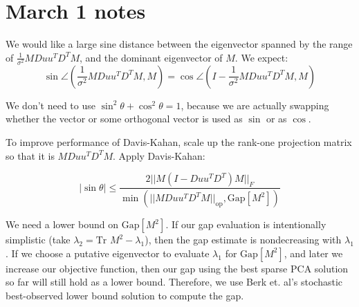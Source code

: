 \documentclass{article}
\begin{document}
\section{March 1 notes}

We would like a large sine distance between the eigenvector spanned by the range of $\frac{1}{\sigma^2} MDuu^T D^T M$, and the dominant eigenvector of $M$. We expect: $$\sin \angle(\frac{1}{\sigma^2} MDuu^T D^T M, M) = \cos \angle (I-\frac{1}{\sigma^2} MDuu^T D^T M, M)$$

We don't need to use $\sin^2\theta + \cos^2\theta = 1$, because we are actually swapping whether the vector or some orthogonal vector is used as $\sin$ or as $\cos$.

To improve performance of Davis-Kahan, scale up the rank-one projection matrix so that it is $MDuu^T D^T M$. Apply Davis-Kahan:

$$
|\sin\theta|
\le
\frac{2||M(I-Duu^TD^T)M||_F}{\min(||MDuu^TD^TM||_\text{op}, \text{Gap}[M^2])}
$$

We need a lower bound on $\text{Gap}[M^2]$. If our gap evaluation is intentionally simplistic (take $\lambda_2 = \text{Tr }M^2 - \lambda_1$), then the gap estimate is nondecreasing with $\lambda_1$. If we choose a putative eigenvector to evaluate $\lambda_1$ for $\text{Gap}[M^2]$, and later we increase our objective function, then our gap using the best sparse PCA solution so far will still hold as a lower bound. Therefore, we use Berk et. al's stochastic best-observed lower bound solution to compute the gap.
\end{document}
